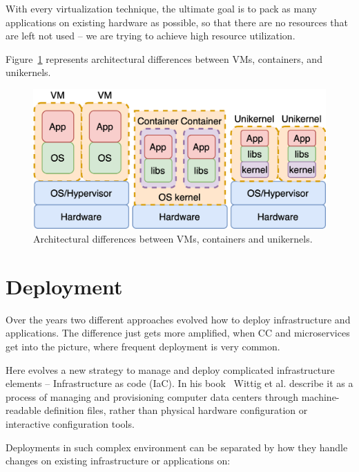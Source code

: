 \noindent
With every virtualization technique, the ultimate goal is to pack as many applications on existing hardware as possible, so that there are no resources that are left not used -- we are trying to achieve high resource utilization. 

Figure~\ref{fig:fig5} represents architectural differences between VMs, containers, and unikernels.

\begin{figure}[H]
	\begin{center}
		\includegraphics[scale=0.9]{images/Figure5.png}
	\end{center}
	\vspace{-0.6cm}
	\caption{Architectural differences between VMs, containers and unikernels.}
	\label{fig:fig5}
\end{figure}
%
%
\section{Deployment}\label{sec:deployment}
%
Over the years two different approaches evolved how to deploy infrastructure and applications. The difference just gets more amplified, when CC and microservices get into the picture, where frequent deployment is very common. 

Here evolves a new strategy to manage and deploy complicated infrastructure elements -- Infrastructure as code (IaC). In his book~\cite{wittig2018amazon} Wittig et al. describe it as a process of managing and provisioning computer data centers through machine-readable definition files, rather than physical hardware configuration or interactive configuration tools.

Deployments in such complex environment can be separated by how they handle changes on existing infrastructure or applications on:


